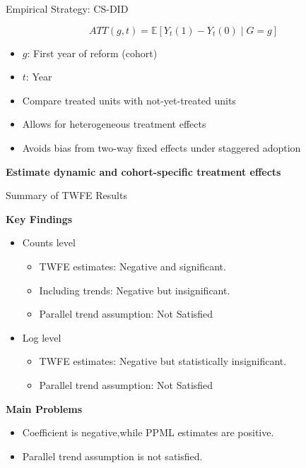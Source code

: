 \documentclass{beamer}
\begin{document}
\begin{frame}{Empirical Strategy: CS-DID}

\[
ATT(g,t) = \mathbb{E}[Y_t(1) - Y_t(0) \mid G = g]
\]

\vspace{0.4cm}

\begin{itemize}
    \item $g$: First year of reform (cohort)
    \item $t$: Year
    \item Compare treated units with not-yet-treated units
\end{itemize}

\vspace{0.4cm}

\begin{itemize}
    \item Allows for heterogeneous treatment effects
    \item Avoids bias from two-way fixed effects under staggered adoption
\end{itemize}

\vspace{0.4cm}

\centering
\textbf{Estimate dynamic and cohort-specific treatment effects}

\end{frame}



\begin{frame}{Summary of TWFE Results}

\textbf{Key Findings}

\begin{itemize}
    \item Counts level
    \begin{itemize}
        \item TWFE  estimates: Negative and significant.
        \item Including  trends: Negative but insignificant.
        \item Parallel trend assumption: Not Satisfied
    \end{itemize}

    \item Log level
    \begin{itemize}
    \item TWFE  estimates: Negative but statistically insignificant.
    \item Parallel trend assumption: Not Satisfied 
    \end{itemize}

\end{itemize}

\textbf{Main  Problems}
\begin{itemize}
    \item Coefficient is negative,while PPML estimates are positive.
    \item Parallel trend assumption is not satisfied.
\end{itemize}

\end{frame}
\end{document}
